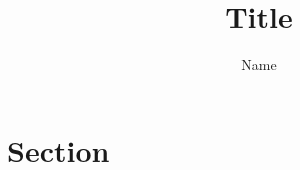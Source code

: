 \documentclass[a4paper,11pt]{article}
\author{Name}
\title{Title}
\numberwithin{equation}{section} %
\theoremstyle{definition} %
\begin{document}
    \maketitle


    \section{Section}

\end{document}
